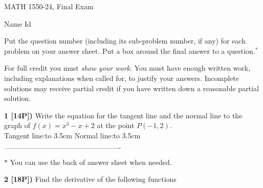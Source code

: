 \documentclass[12pt]{article}
\begin{document}
\begin{large}
\begin{bf}
\hspace{.75in}
{MATH 1550-24, Final Exam} %
\hspace{1in}
\parbox{1in}{ Name \newline Id}
\end{bf}
\end{large}

\vspace*{.152in}

Put the question number (including its sub-problem number, if any) for each 
problem on your answer sheet. 
Put a box around the final answer to a question.$^*$

\vspace*{.02in}
For full credit you must \emph{show your work}. You must have enough
written work, including explanations when called for, to justify your
answers. Incomplete solutions may receive partial credit if you have
written down a reasonable partial solution. %
                 

\vspace{.25in}

{\bf 1 [14P])} Write the equation for the tangent line and the
normal line to the graph of 
${\displaystyle f(x) = x^3 - x +2 }$
at the point $P(-1,2)$. \\

Tangent line:\hbox to 3.5cm{\hrulefill}\hfill
Normal line:\hbox to 3.5cm{\hrulefill}\hfill




\vspace{3.360in}

$\text{-------------------------------------------------}$

\begin{small}
$*$ You can use the back of answer sheet when needed. %
\end{small}



{\bf 2 [18P])} Find the derivative of the following functions\\
\end{document}
